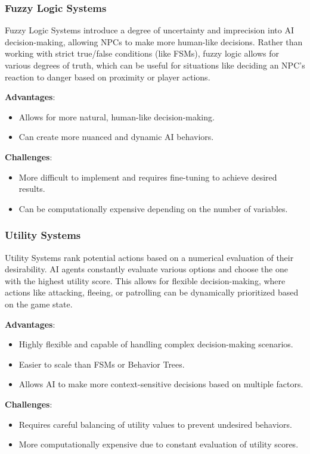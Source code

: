 \documentclass{article} %
\begin{document}
\subsubsection{Fuzzy Logic Systems}

Fuzzy Logic Systems introduce a degree of uncertainty and imprecision into AI decision-making, allowing NPCs to make more human-like decisions. Rather than working with strict true/false conditions (like FSMs), fuzzy logic allows for various degrees of truth, which can be useful for situations like deciding an NPC's reaction to danger based on proximity or player actions.

\textbf{Advantages}:
\begin{itemize}
	\item Allows for more natural, human-like decision-making.
	\item Can create more nuanced and dynamic AI behaviors.
\end{itemize}

\textbf{Challenges}:
\begin{itemize}
	\item More difficult to implement and requires fine-tuning to achieve desired results.
	\item Can be computationally expensive depending on the number of variables.
\end{itemize}

\subsubsection{Utility Systems}

Utility Systems rank potential actions based on a numerical evaluation of their desirability. AI agents constantly evaluate various options and choose the one with the highest utility score. This allows for flexible decision-making, where actions like attacking, fleeing, or patrolling can be dynamically prioritized based on the game state.

\textbf{Advantages}:
\begin{itemize}
	\item Highly flexible and capable of handling complex decision-making scenarios.
	\item Easier to scale than FSMs or Behavior Trees.
	\item Allows AI to make more context-sensitive decisions based on multiple factors.
\end{itemize}

\textbf{Challenges}:
\begin{itemize}
	\item Requires careful balancing of utility values to prevent undesired behaviors.
	\item More computationally expensive due to constant evaluation of utility scores.
\end{itemize}
\end{document}
